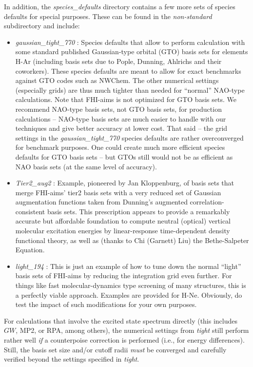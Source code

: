 In addition, the \emph{species\_defaults} directory contains a few
more sets of species defaults for special purposes. These can be found
in the \emph{non-standard} subdirectory and include:
\begin{itemize}
  \item \emph{gaussian\_tight\_770} : Species defaults that allow to
    perform calculation with some standard published Gaussian-type
    orbital (GTO) basis sets for elements H-Ar (including basis sets due to
    Pople, Dunning, Ahlrichs and their coworkers). These species
    defaults are meant to allow for exact benchmarks against
    GTO codes such as NWChem. The other
    numerical settings (especially grids) are thus much tighter than
    needed for ``normal'' NAO-type calculations. Note that FHI-aims is
    not optimized for GTO basis sets. We recommend
    NAO-type basis sets, not GTO basis sets, for production
    calculations -- NAO-type basis sets are much easier to handle
    with our techniques and give better accuracy at lower cost. That
    said -- the grid settings in the \emph{gaussian\_tight\_770}
    species defaults are rather overconverged for benchmark
    purposes. One could create much more efficient species defaults for
    GTO basis sets -- but GTOs still would not be as efficient as NAO
    basis sets (at the same level of accuracy).
  \item \emph{Tier2\_aug2} : Example, pioneered by Jan Kloppenburg, of
    basis sets that merge FHI-aims' tier2 basis sets with a very
    reduced set of Gaussian augmentation functions taken from
    Dunning's augmented correlation-consistent basis sets. This
    prescription appears to provide a remarkably accurate but affordable
    foundation to compute neutral (optical) vertical molecular
    excitation energies by linear-response time-dependent density
    functional theory, as well as (thanks to Chi (Garnett) Liu) the
    Bethe-Salpeter Equation.
  \item \emph{light\_194} : This is just an example of how to tune
    down the normal ``light'' basis sets of FHI-aims by reducing the
    integration grid even further. For things like fast
    molecular-dynamics type screening of many structures, this is a
    perfectly viable approach. Examples are provided for
    H-Ne. Obviously, do test the impact of such modifications for your
    own purposes.
\end{itemize}

For calculations that involve the excited state spectrum directly (this
includes $GW$, MP2, or RPA, among others), the numerical settings
from \emph{tight} still perform rather well \emph{if} a
counterpoise correction is performed (i.e., for energy
differences). Still, the basis set size and/or cutoff radii
\emph{must} be converged and carefully verified beyond the settings
specified in \emph{tight}.

